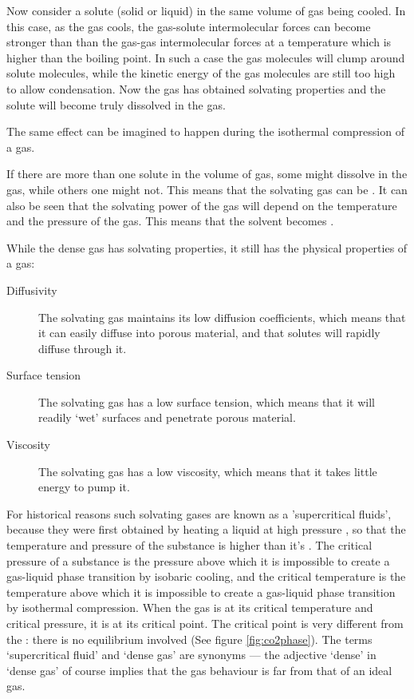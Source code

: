 Now consider a solute (solid or liquid) in the same volume of gas being cooled.
In this case, as the gas cools, the gas-solute intermolecular forces can become
stronger than than the gas-gas intermolecular forces at a temperature which is
higher than the boiling point. In such a case the gas molecules will clump
around solute molecules, while the kinetic energy of the gas molecules are still
too high to allow condensation. Now the gas has obtained solvating properties
and the solute will become truly dissolved in the gas.

The same effect can be imagined to happen during the isothermal compression of a
gas.

If there are more than one solute in the volume of gas, some might dissolve in
the gas, while others one might not. This means that the solvating gas can be
. It can also be seen that the solvating power of the gas will
depend on the temperature and the pressure of the gas. This means that the
solvent becomes .

While the dense gas has solvating properties, it still has the physical
properties of a gas:

\begin{description} 

\item[Diffusivity] The solvating gas maintains its low diffusion coefficients,
which means that it can easily diffuse into porous material, and that solutes
will rapidly diffuse through it.

\item[Surface tension] The solvating gas has a low surface tension, which means
that it will readily `wet' surfaces and penetrate porous material.

\item[Viscosity] The solvating gas has a low viscosity, which means that it
takes little energy to pump it.

\end{description} 

For historical reasons such solvating gases are known as a 'supercritical
fluids', because they were first obtained by heating a liquid at high pressure
\autocite{Berche2009}, so that the temperature and pressure of the substance is
higher than it's . The critical pressure of a substance
is the pressure above which it is impossible to create a gas-liquid phase
transition by isobaric cooling, and the critical temperature is the temperature
above which it is impossible to create a gas-liquid phase transition by
isothermal compression.
When the gas is at its critical temperature and critical pressure, it is at its
critical point. The critical point is very different from the : there is no equilibrium involved (See figure \ref{fig:co2phase}). The
terms `supercritical fluid' and `dense gas' are synonyms \autocite{Randall1982}
--- the adjective `dense' in `dense gas' of course implies that the gas
behaviour is far from that of an ideal gas.

